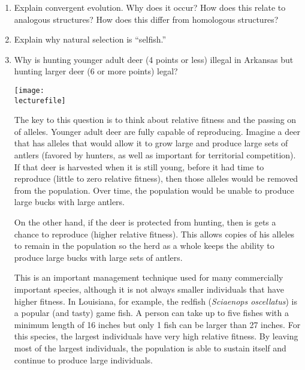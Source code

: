 \documentclass[letterpaper]{tufte-handout}
\newcommand\lecturefile{163_lecture06_fullsize}
\begin{document}
\begin{enumerate}

	\item Explain convergent evolution. Why does it occur? How does this relate to analogous structures? How does this differ from homologous structures?

	\item	Explain why natural selection is ``selfish.''

	\item	Why is hunting younger adult deer (4 points or less) illegal in Arkansas but hunting larger deer (6 or more points) legal?  
	
	\begin{marginfigure}[0.5in]
		\texttt{[image: \\lecturefile]}
	\end{marginfigure}
	
	The key to this question is to think about relative fitness and the passing on of alleles.  Younger adult deer are fully capable of reproducing. Imagine a deer that has alleles that would allow it to grow large and produce large sets of antlers (favored by hunters, as well as important for territorial competition). If that deer is harvested when it is still young, before it had time to reproduce (little to zero relative fitness), then those alleles would be removed from the population. Over time, the population would be unable to produce large bucks with large antlers.	
	
	On the other hand, if the deer is protected from hunting, then is gets a chance to reproduce (higher relative fitness). This allows copies of his alleles to remain in the population so the herd as a whole keeps the ability to produce large bucks with large sets of antlers.
	
	This is an important management technique used for many commercially important species, although it is not always smaller individuals that have higher fitness. In Louisiana, for example, the redfish (\textit{Sciaenops oscellatus}) is a popular (and tasty) game fish. A person can take up to five fishes with a minimum length of 16 inches but only 1 fish can be larger than 27 inches. For this species, the largest individuals have very high relative fitness. By leaving most of the largest individuals, the population is able to sustain itself and continue to produce large individuals.
	


\end{enumerate}
\end{document}
